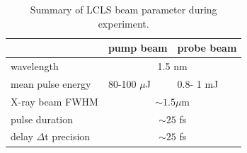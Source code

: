 \begin{table}
	\centering
		\begin{tabular}{ | l | l | l | }
		\hline
			 & pump beam & probe beam  \\ \hline
			wavelength & \multicolumn{2}{|c|}{1.5 nm} \\ \hline
			mean pulse energy & 80-100 $\mu$J & 0.8- 1 mJ \\ \hline
			X-ray beam FWHM & \multicolumn{2}{|c|}{$\sim 1.5 \mu$m} \\ \hline
			pulse duration & \multicolumn{2}{|c|}{$\sim 25$ fs} \\ \hline
			delay $\Delta$t precision & \multicolumn{2}{|c|}{$\sim 25$ fs} \\ \hline
		\end{tabular}
	\caption{Summary of LCLS beam parameter during experiment.}
	\label{tab:beam-params}
\end{table}
%
%
%
